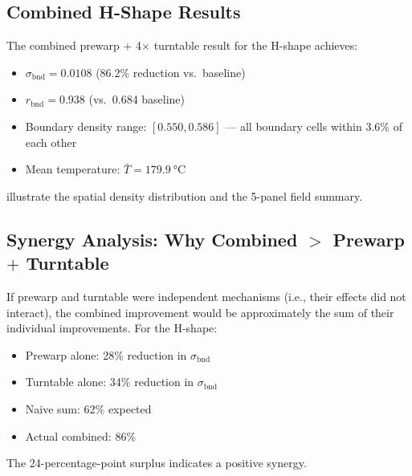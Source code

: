 \documentclass[5p,times]{elsarticle}
\newcommand{\bndstd}{\sigma_{\mathrm{bnd}}}
\begin{document}
\subsection{Combined H-Shape Results}

The combined prewarp + 4$\times$ turntable result for the H-shape
achieves:
\begin{itemize}
  \item $\bndstd = 0.0108$ (86.2\% reduction vs.\ baseline)
  \item $r_{\mathrm{bnd}} = 0.938$ (vs.\ 0.684 baseline)
  \item Boundary density range: $[0.550, 0.586]$ --- all boundary cells
        within 3.6\% of each other
  \item Mean temperature: $\bar{T} = \SI{179.9}{\celsius}$
\end{itemize}
 illustrate the spatial
density distribution and the 5-panel field summary.

\subsection{Synergy Analysis: Why Combined $>$ Prewarp $+$ Turntable}

If prewarp and turntable were independent mechanisms (i.e., their
effects did not interact), the combined improvement would be
approximately the sum of their individual improvements.  For the
H-shape:
\begin{itemize}
  \item Prewarp alone: 28\% reduction in $\bndstd$
  \item Turntable alone: 34\% reduction in $\bndstd$
  \item Naive sum: 62\% expected
  \item Actual combined: 86\%
\end{itemize}
The 24-percentage-point surplus indicates a positive synergy.
\end{document}
